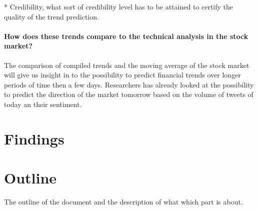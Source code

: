 * Credibility, what sort of credibility level has to be attained to certify the
quality of the trend prediction. 

	\paragraph{How does these trends compare to the technical analysis in the
stock market?\\}
	The comparison of compiled trends and the moving average of the stock
market will  give us insight in to the possibility to predict financial trends
over longer periods of time then a few days. Researchers has already looked at
the possibility to predict the direction of the market tomorrow based on the
volume of tweets of today an their sentiment. 

\section{Findings}

\section{Outline}
The outline of the document and the description of what which part is about. 


